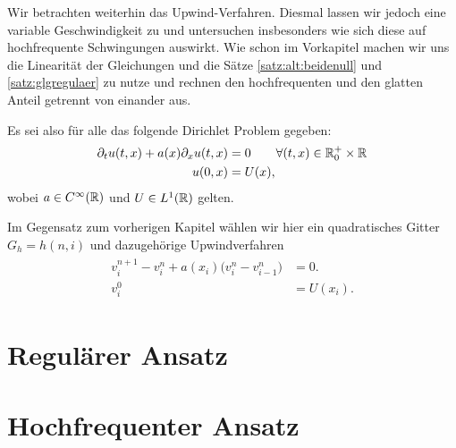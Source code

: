 
Wir betrachten weiterhin das Upwind-Verfahren. Diesmal lassen wir jedoch eine
variable Geschwindigkeit zu und untersuchen insbesonders wie sich diese auf
hochfrequente Schwingungen auswirkt. Wie schon im Vorkapitel machen wir uns die
Linearität der Gleichungen und die Sätze \ref{satz:alt:beidenull} und
\ref{satz:glgregulaer} zu nutze und rechnen den hochfrequenten und den glatten
Anteil getrennt von einander aus.

Es sei also für alle das folgende Dirichlet Problem gegeben:
\begin{align}\label{eq:varadv:pde}
\begin{split}
\partial_t u(t, x) + a(x) \partial_x u(t, x) &= 0 \qquad \forall (t, x) \in \mathbb R^+_0 \times \mathbb R\\
u(0, x) &= U(x),
\end{split}
\end{align}
wobei $a \in C^\infty(\mathbb R)$ und $U \in L^1(\mathbb R)$ gelten.

Im Gegensatz zum vorherigen Kapitel wählen wir hier ein quadratisches Gitter $G_h = h (n, i)$ und dazugehörige
Upwindverfahren
\begin{align}\label{eq:varadv:verfahren}
\begin{split}
v^{n+1}_i - v^n_i + a(x_i) \bigl( v^n_i - v^n_{i-1} \bigr) &= 0.\\
v^0_i &= U(x_i).
\end{split}
\end{align}

\section{Regulärer Ansatz}



\section{Hochfrequenter Ansatz}

